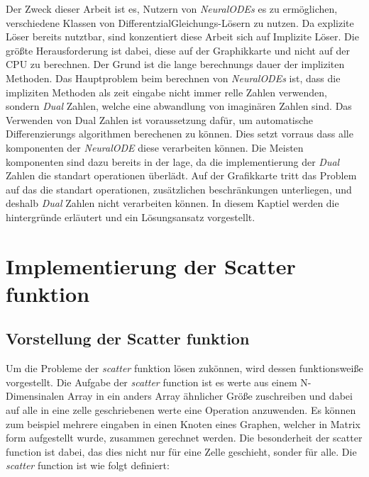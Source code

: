 Der Zweck dieser Arbeit ist es, Nutzern von \textit{NeuralODEs} es zu ermöglichen, 
verschiedene Klassen von DifferentzialGleichungs-Lösern zu nutzen.
Da explizite Löser bereits nutztbar, 
sind konzentiert diese Arbeit sich auf Implizite Löser. 
Die größte Herausforderung ist dabei, 
diese auf der Graphikkarte und nicht auf der CPU zu berechnen.
Der Grund ist die lange berechnungs dauer der impliziten Methoden.
Das Hauptproblem beim berechnen von \textit{NeuralODEs} ist, 
dass die impliziten Methoden als zeit eingabe nicht immer relle Zahlen verwenden,
sondern \textit{Dual} Zahlen, welche eine abwandlung von imaginären Zahlen sind.
Das Verwenden von Dual Zahlen ist voraussetzung dafür, 
um automatische Differenzierungs algorithmen berechenen zu können.
Dies setzt vorraus dass alle komponenten der \textit{NeuralODE} diese verarbeiten können.
Die Meisten komponenten sind dazu bereits in der lage, 
da die implementierung der \textit{Dual} Zahlen
die standart operationen überlädt.
Auf der Grafikkarte tritt das Problem auf das die standart operationen, 
zusätzlichen beschränkungen unterliegen, 
und deshalb \textit{Dual} Zahlen nicht verarbeiten können.
In diesem Kaptiel werden die hintergründe erläutert und ein Lösungsansatz vorgestellt.


\section{Implementierung der Scatter funktion}
\subsection{Vorstellung der Scatter funktion}

Um die Probleme der \textit{scatter} funktion lösen zukönnen, 
wird dessen funktionsweiße vorgestellt.
Die Aufgabe der \textit{scatter} function ist es werte aus einem N-Dimensinalen Array in ein anders 
 Array ähnlicher Größe zuschreiben und dabei auf alle in eine zelle geschriebenen werte eine Operation anzuwenden.
Es können zum beispiel mehrere eingaben in einen Knoten eines Graphen, 
welcher in Matrix form aufgestellt wurde,
zusammen gerechnet werden.
Die besonderheit der scatter function ist dabei, 
das dies nicht nur für eine Zelle geschieht, 
sonder für alle.
Die \textit{scatter} function ist wie folgt definiert:

